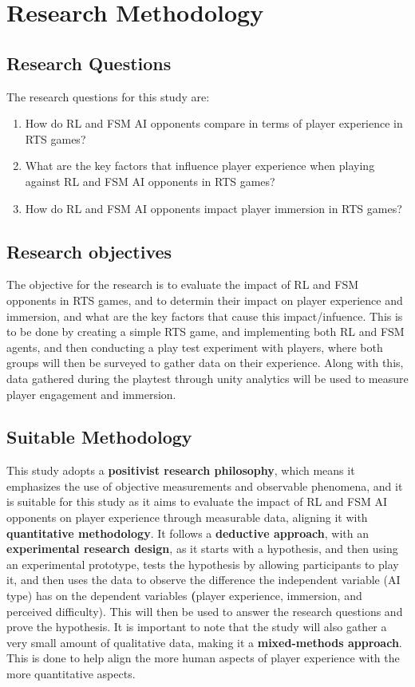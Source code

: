 \documentclass[conference]{IEEEtran}
\begin{document}
\section{Research Methodology}

\subsection{Research Questions}
The research questions for this study are:

\begin{enumerate}
    \item How do RL and FSM AI opponents compare in terms of player experience in RTS games?
    \item What are the key factors that influence player experience when playing against RL and FSM AI opponents in RTS games?
    \item How do RL and FSM AI opponents impact player immersion in RTS games?
\end{enumerate}

\subsection{Research objectives}

The objective for the research is to evaluate the impact of RL and FSM opponents in RTS games, and to determin their impact on player experience and immersion,
and what are the key factors that cause this impact/infuence. This is to be done by creating a simple RTS game, and implementing both RL and FSM agents,
and then conducting a play test experiment with players, where both groups will then be surveyed to gather data on their experience. Along with this,
data gathered during the playtest through unity analytics will be used to measure player engagement and immersion.

\subsection{Suitable Methodology}

This study adopts a \textbf{positivist research philosophy}, which means it emphasizes the use of objective measurements and observable phenomena, and it is suitable for this study as it aims
to evaluate the impact of RL and FSM AI opponents on player experience through measurable data, aligning it with \textbf{quantitative methodology}. It follows a \textbf{deductive approach}, with an \textbf{experimental research design},
as it starts with a hypothesis, and then using an experimental prototype, tests the hypothesis by allowing participants to play it, and then uses the data to observe the difference the independent variable (AI type)
has on the dependent variables \textbf(player experience, immersion, and perceived difficulty). This will then be used to answer the research questions and prove the hypothesis. It is important to note that the study
will also gather a very small amount of qualitative data, making it a \textbf{mixed-methods approach}. This is done to help align the more human aspects of player experience with the more quantitative aspects.
\end{document}
